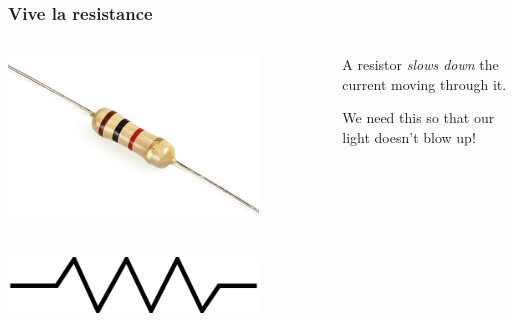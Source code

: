 \documentclass{beamer}
\begin{document}
\begin{frame}
  \frametitle{Vive la resistance}

  \begin{columns}
    \begin{column}{0.5\textwidth}
      \centering
      \includegraphics[width=0.8\textwidth]{res/resistor.jpg}

      ~ \\

      \includegraphics[width=0.8\textwidth]{res/resistor-symbol.png}
    \end{column}
    \begin{column}{0.5\textwidth}
      A resistor \emph{slows down} the current moving through it.

      We need this so that our light doesn't blow up!
    \end{column}
  \end{columns}
\end{frame}
\end{document}

